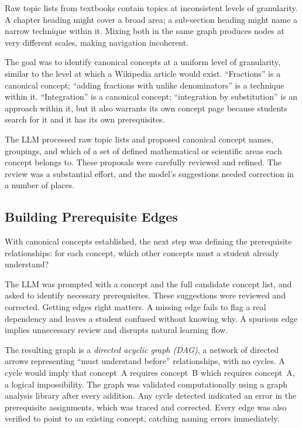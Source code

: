\documentclass[12pt,a4paper]{article}
\begin{document}
Raw topic lists from textbooks contain topics at inconsistent levels of granularity.
A chapter heading might cover a broad area; a sub-section heading might name a
narrow technique within it.
Mixing both in the same graph produces nodes at very different scales,
making navigation incoherent.

The goal was to identify canonical concepts at a uniform level of granularity,
similar to the level at which a Wikipedia article would exist.
``Fractions'' is a canonical concept; ``adding fractions with unlike denominators''
is a technique within it.
``Integration'' is a canonical concept; ``integration by substitution'' is an approach
within it, but it also warrants its own concept page because students search for it
and it has its own prerequisites.

The LLM processed raw topic lists and proposed canonical concept names, groupings,
and which of a set of defined mathematical or scientific areas each concept belongs to.
These proposals were carefully reviewed and refined.
The review was a substantial effort, and the model's suggestions
needed correction in a number of places.

\subsection{Building Prerequisite Edges}

With canonical concepts established, the next step was defining the prerequisite
relationships: for each concept, which other concepts must a student already understand?

The LLM was prompted with a concept and the full candidate concept list,
and asked to identify necessary prerequisites.
These suggestions were reviewed and corrected.
Getting edges right matters.
A missing edge fails to flag a real dependency and leaves a student confused without
knowing why.
A spurious edge implies unnecessary review and disrupts natural learning flow.

The resulting graph is a \emph{directed acyclic graph (DAG)}, a network of directed
arrows representing ``must understand before'' relationships, with no cycles.
A cycle would imply that concept~A requires concept~B which requires concept~A,
a logical impossibility.
The graph was validated computationally using a graph analysis library after every addition.
Any cycle detected indicated an error in the prerequisite assignments, which was
traced and corrected.
Every edge was also verified to point to an existing concept, catching naming errors immediately.
\end{document}
